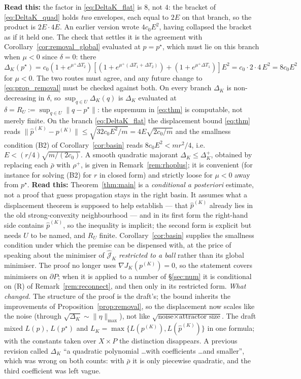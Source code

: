 \documentclass[11pt]{article}
\theoremstyle{remark}\newtheorem{remark}{Remark}
\newcommand{\pstar}{p^\star}
\newcommand{\norm}[1]{\lVert #1\rVert}
\newcommand{\hatJ}{\hat{\mathcal J}}
\newcommand{\readthis}[1]{\textbf{Read this:} #1}
\begin{document}
\readthis{the factor in \eqref{eq:DeltaK_flat} is $8$, not $4$: the bracket of \eqref{eq:DeltaK_quad} holds \emph{two} envelopes, each equal to $2E$ on that branch, so the product is $2E\cdot4E$. An earlier version wrote $4c_0E^{2}$, having collapsed the bracket as if it held one. The check that settles it is the agreement with Corollary~\ref{cor:removal_global} evaluated at $p=\pstar$, which must lie on this branch when $\mu<0$ since $\delta=0$: there $\Delta_K(\pstar)=c_0(1+e^{\mu^{+}\Delta T_2})[(1+e^{\mu^{+}(\Delta T_1+\Delta T_2)})+(1+e^{\mu^{+}\Delta T_1})]E^{2}=c_0\cdot2\cdot4\,E^{2}=8c_0E^{2}$ for $\mu<0$. The two routes must agree, and any future change to \eqref{eq:prop_removal} must be checked against both.}
On every branch $\Delta_K$ is non-decreasing in $\delta$, so $\sup_{q\in U}\Delta_K(q)$ is $\Delta_K$ evaluated at $\delta=R_U:=\sup_{q\in U}\norm{q-\pstar}$: the supremum in \eqref{eq:thm} is computable, not merely finite. On the branch \eqref{eq:DeltaK_flat} the displacement bound \eqref{eq:thm} reads $\norm{\hat p^{(K)}-p^{(K)}}\le\sqrt{32c_0E^{2}/m}=4E\sqrt{2c_0/m}$ and the smallness condition (B2) of Corollary~\ref{cor:basin} reads $8c_0E^{2}<mr^{2}/4$, i.e.\ $E<(r/4)\sqrt{m/(2c_0)}$. A smooth quadratic majorant $\Delta_K\le\Delta_K^{+}$, obtained by replacing each $\bar\rho$ with $\rho^{+}$, is given in Remark~\ref{rem:rhoplus}; it is convenient (for instance for solving (B2) for $r$ in closed form) and strictly loose for $\mu<0$ away from $\pstar$.
\readthis{Theorem~\ref{thm:main} is a \emph{conditional a posteriori} estimate, not a proof that guess propagation stays in the right basin. It assumes what a displacement theorem is supposed to help establish --- that $\hat p^{(K)}$ already lies in the old strong-convexity neighbourhood --- and in its first form the right-hand side contains $\hat p^{(K)}$, so the inequality is implicit; the second form is explicit but needs $U$ to be named, and $R_U$ finite. Corollary~\ref{cor:basin} supplies the smallness condition under which the premise can be dispensed with, at the price of speaking about the minimiser of $\hatJ_K$ \emph{restricted to a ball} rather than its global minimiser. The proof no longer uses $\nabla J_K(p^{(K)})=0$, so the statement covers minimisers on $\partial P$; when it is applied to a number of \S\ref{sec:num} it is conditional on (R) of Remark~\ref{rem:reconnect}, and then only in its restricted form.}
\emph{What changed.} The structure of the proof is the draft's; the bound inherits the improvements of Proposition~\ref{prop:removal}, so the displacement now scales like the noise (through $\sqrt{\Delta_K}\sim\norm\eta_{\max}$), not like $\sqrt{\text{noise}\times\text{attractor size}}$. The draft mixed $L(p)$, $L(\pstar)$ and $L_K=\max\{L(p^{(K)}),L(\hat p^{(K)})\}$ in one formula; with the constants taken over $X\times P$ the distinction disappears. A previous revision called $\Delta_K$ ``a quadratic polynomial \dots with coefficients \dots and smaller'', which was wrong on both counts: with $\bar\rho$ it is only piecewise quadratic, and the third coefficient was left vague.
\end{document}
